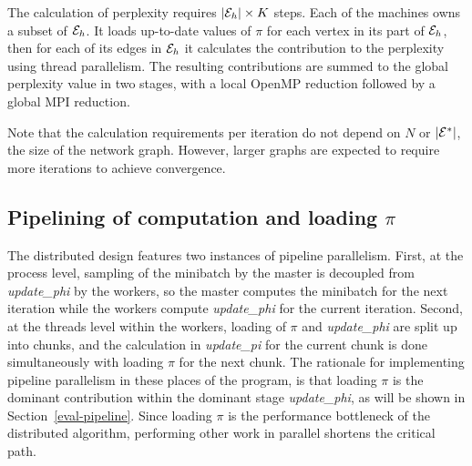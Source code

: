 The calculation of perplexity requires $|\cE_h|\times K$ steps. Each of the
machines owns a subset of $\cE_h$. It loads up-to-date values of $\pi$ for each
vertex in its part of $\cE_h$, then for each of its edges in $\cE_h$ it calculates the
contribution to the perplexity using thread parallelism. The resulting
contributions are summed to the global perplexity value in two stages,
with a local OpenMP reduction followed by a global MPI reduction.

Note that the calculation requirements per iteration do not depend
on $N$ or $|\cE^*|$, the size of the network graph. However, larger graphs are
expected to require more iterations to achieve convergence.

\subsection{Pipelining of computation and loading $\pi$}

The distributed design features two instances of pipeline parallelism. First,
at the process level, sampling of the minibatch by the master is decoupled
from \textit{update\_phi} by the workers, so the master computes the minibatch
for the next iteration while the workers compute \textit{update\_phi} for the
current iteration. Second, at the threads level within the workers, loading of
$\pi$ and \textit{update\_phi} are split up into chunks, and the calculation
in \textit{update\_pi} for the current chunk is done simultaneously with
loading $\pi$ for the next chunk. The rationale for implementing pipeline
parallelism in these places of the program, is that loading $\pi$ is the
dominant contribution within the dominant stage \textit{update\_phi}, as
will be shown in Section~\ref{eval-pipeline}.  Since loading $\pi$ is the
performance bottleneck of the distributed algorithm, performing other work
in parallel shortens the critical path.
